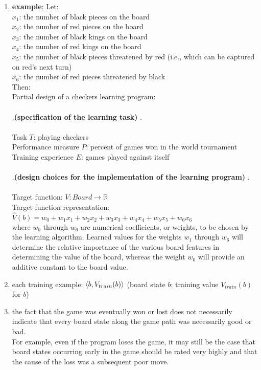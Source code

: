 \begin{enumerate}[itemsep=0.2cm]
    \item[] \textbf{example}: Let:
    \\
    $x_1$: the number of black pieces on the board 
    \\
    $x_2$: the number of red pieces on the board 
    \\
    $x_3$: the number of black kings on the board 
    \\
    $x_4$: the number of red kings on the board 
    \\
    $x_5$: the number of black pieces threatened by red (i.e., which can be captured on red's next turn) 
    \\
    $x_6$: the number of red pieces threatened by black 
    \vspace{0.3cm} \noindent
    \\
    Then: 
    \\
    Partial design of a checkers learning program: 
    \\ \\
    .\hfill \textbf{(specification of the learning task)} \hfill.
    \\ \\
    Task $T$: playing checkers 
    \\
    Performance measure $P$: percent of games won in the world tournament 
    \\
    Training experience $E$: games played against itself 
    \\ \\
    .\hfill \textbf{(design choices for the implementation of the learning program)} \hfill.
    \\ \\
    Target function: $V: Board \to \mathbb{R}$ 
    \\
    Target function representation: $\hat{V}(b) = w_0 + w_1x_1 + w_2x_2 + w_3x_3 + w_4x_4 + w_5x_5 + w_6x_6$ 
    \\
    where $w_0$ through $w_6$ are numerical coefficients, or weights, to be chosen by the learning algorithm. Learned values for the weights $w_1$ through $w_6$ will determine the relative importance of the various board features in determining the value of the board, whereas the weight $w_0$ will provide an additive constant to the board value. 
    
    \item each training example: $\left< b, V_{train}(b)\right >$
        \hfill (board state $b$; training value $V_{train}(b)$ for $b$)

    \item the fact that the game was eventually won or lost does not necessarily indicate that every board state along the game path was necessarily good or bad.
    \hfill \cite{ml/book/Machine-Learning/Tom-M-Mitchell}
    \\
    For example, even if the program loses the game, it may still be the case that board states occurring early in the game should be rated very highly and that the cause of the loss was a subsequent poor move. 
    \hfill \cite{ml/book/Machine-Learning/Tom-M-Mitchell}


\end{enumerate}
